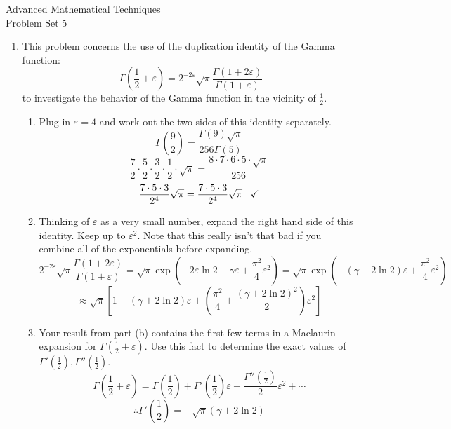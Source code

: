 \documentclass{article}
\begin{document}
\thispagestyle{fancy}
\begin{center}\LARGE{Advanced Mathematical Techniques \\ Problem Set 5}\end{center}
\vspace{10mm}
\begin{enumerate}
    \item This problem concerns the use of the duplication identity of the Gamma function:
    \[\Gamma\left( \frac 1 2 + \varepsilon \right) = 2^{-2\varepsilon}\sqrt{\pi}\frac{\Gamma(1+2\varepsilon)}{\Gamma(1+\varepsilon)}\]
    to investigate the behavior of the Gamma function in the vicinity of $\frac 1 2$.
    \begin{enumerate}
        \item Plug in $\varepsilon = 4$ and work out the two sides of this identity separately.
        \\
        \[\Gamma\left(\frac{9}{2}\right) = \frac{\Gamma(9)\sqrt{\pi}}{256\Gamma(5)}\]
        \[\frac 7 2 \cdot \frac 5 2 \cdot \frac 3 2 \cdot \frac 1 2 \cdot \sqrt{\pi} = \frac{8\cdot7\cdot6\cdot5\cdot\sqrt{\pi}}{256}\]
        \[\frac{7 \cdot 5 \cdot 3}{2^4}\sqrt{\pi} = \frac{7 \cdot 5 \cdot 3}{2^4}\sqrt{\pi} \hspace{3mm} \checkmark\]
        \item Thinking of $\varepsilon$ as a very small number, expand the right hand side of this identity. Keep up to $\varepsilon^2$. Note that this really isn't that bad if you combine all of the exponentials before expanding.
        \\
        \[2^{-2\varepsilon}\sqrt{\pi}\frac{\Gamma(1+2\varepsilon)}{\Gamma(1+\varepsilon)} = \sqrt{\pi}\exp(-2\varepsilon \ln 2 - \gamma \varepsilon + \frac{\pi^2}{4}\varepsilon^2) = \sqrt{\pi}\exp(-(\gamma + 2 \ln 2)\varepsilon + \frac{\pi^2}{4}\varepsilon^2)\]
        \[ \approx \boxed{\sqrt{\pi}\left[ 1 - (\gamma + 2 \ln 2)\varepsilon + \left( \frac{\pi^2}{4} + \frac{(\gamma + 2 \ln 2)^2}{2}\right)\varepsilon^2\right]}\]
        \item Your result from part (b) contains the first few terms in a Maclaurin expansion for $\Gamma(\frac 1 2 + \varepsilon)$. Use this fact to determine the exact values of $\Gamma'(\frac 1 2), \Gamma''(\frac 1 2)$.
        \\
        \[\Gamma\left(\frac{1}{2} + \varepsilon\right) = \Gamma\left( \frac 1 2\right) + \Gamma'\left( \frac 1 2\right)\varepsilon + \frac{\Gamma''(\frac 1 2)}{2}\varepsilon^2 + \cdots\]
        \[\boxed{\therefore \Gamma'\left( \frac 1 2 \right) = -\sqrt{\pi}(\gamma + 2 \ln 2)}\]

\end{enumerate}
\end{enumerate}
\end{document}
